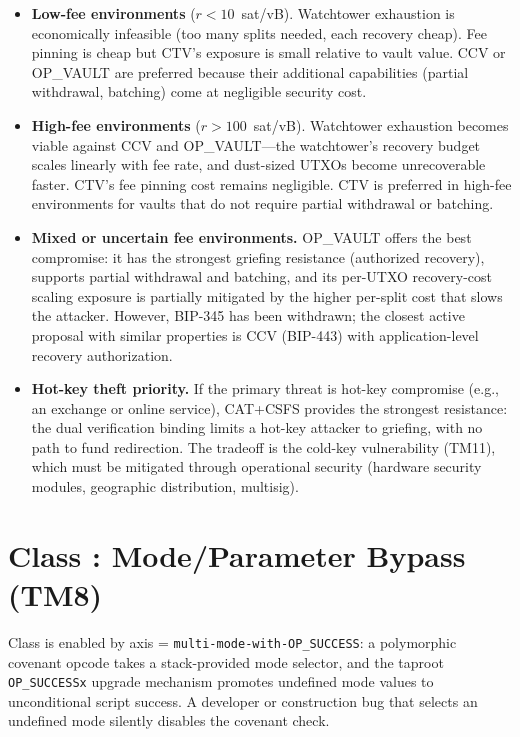 \begin{itemize}
\item \textbf{Low-fee environments} ($r < 10$~sat/vB). Watchtower exhaustion is
  economically infeasible (too many splits needed, each recovery cheap). Fee pinning
  is cheap but CTV's exposure is small relative to vault value. CCV or OP\_VAULT are
  preferred because their additional capabilities (partial withdrawal, batching) come
  at negligible security cost.

\item \textbf{High-fee environments} ($r > 100$~sat/vB). Watchtower exhaustion
  becomes viable against CCV and OP\_VAULT---the watchtower's recovery budget scales
  linearly with fee rate, and dust-sized UTXOs become unrecoverable faster. CTV's
  fee pinning cost remains negligible. CTV is preferred in high-fee environments for
  vaults that do not require partial withdrawal or batching.

\item \textbf{Mixed or uncertain fee environments.} OP\_VAULT offers the best
  compromise: it has the strongest griefing resistance (authorized recovery), supports
  partial withdrawal and batching, and its per-UTXO recovery-cost scaling exposure is partially
  mitigated by the higher per-split cost that slows the attacker. However, BIP-345 has
  been withdrawn; the closest active proposal with similar properties is CCV (BIP-443)
  with application-level recovery authorization.

\item \textbf{Hot-key theft priority.} If the primary threat is hot-key compromise
  (e.g., an exchange or online service), CAT+CSFS provides the strongest resistance:
  the dual verification binding limits a hot-key attacker to griefing, with no path to
  fund redirection. The tradeoff is the cold-key vulnerability (TM11), which must be
  mitigated through operational security (hardware security modules, geographic
  distribution, multisig).
\end{itemize}

\section{Class \classmode{}: Mode/Parameter Bypass (TM8)}
\label{se:class_mode_bypass}

Class \classmode{} is enabled by axis \axopsurf{} =
\texttt{multi-mode-with-OP\_SUCCESS}: a polymorphic covenant opcode
takes a stack-provided mode selector, and the taproot
\texttt{OP\_SUCCESSx} upgrade mechanism promotes undefined mode
values to unconditional script success. A developer or construction
bug that selects an undefined mode silently disables the covenant
check.


